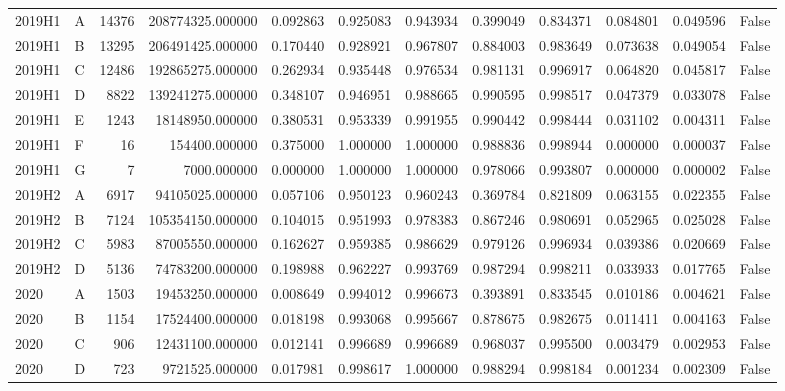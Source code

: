 \begin{tabular}{llrrrrrrrrrr}
2019H1 & A & 14376 & 208774325.000000 & 0.092863 & 0.925083 & 0.943934 & 0.399049 & 0.834371 & 0.084801 & 0.049596 & False \\
2019H1 & B & 13295 & 206491425.000000 & 0.170440 & 0.928921 & 0.967807 & 0.884003 & 0.983649 & 0.073638 & 0.049054 & False \\
2019H1 & C & 12486 & 192865275.000000 & 0.262934 & 0.935448 & 0.976534 & 0.981131 & 0.996917 & 0.064820 & 0.045817 & False \\
2019H1 & D & 8822 & 139241275.000000 & 0.348107 & 0.946951 & 0.988665 & 0.990595 & 0.998517 & 0.047379 & 0.033078 & False \\
2019H1 & E & 1243 & 18148950.000000 & 0.380531 & 0.953339 & 0.991955 & 0.990442 & 0.998444 & 0.031102 & 0.004311 & False \\
2019H1 & F & 16 & 154400.000000 & 0.375000 & 1.000000 & 1.000000 & 0.988836 & 0.998944 & 0.000000 & 0.000037 & False \\
2019H1 & G & 7 & 7000.000000 & 0.000000 & 1.000000 & 1.000000 & 0.978066 & 0.993807 & 0.000000 & 0.000002 & False \\
2019H2 & A & 6917 & 94105025.000000 & 0.057106 & 0.950123 & 0.960243 & 0.369784 & 0.821809 & 0.063155 & 0.022355 & False \\
2019H2 & B & 7124 & 105354150.000000 & 0.104015 & 0.951993 & 0.978383 & 0.867246 & 0.980691 & 0.052965 & 0.025028 & False \\
2019H2 & C & 5983 & 87005550.000000 & 0.162627 & 0.959385 & 0.986629 & 0.979126 & 0.996934 & 0.039386 & 0.020669 & False \\
2019H2 & D & 5136 & 74783200.000000 & 0.198988 & 0.962227 & 0.993769 & 0.987294 & 0.998211 & 0.033933 & 0.017765 & False \\
2020 & A & 1503 & 19453250.000000 & 0.008649 & 0.994012 & 0.996673 & 0.393891 & 0.833545 & 0.010186 & 0.004621 & False \\
2020 & B & 1154 & 17524400.000000 & 0.018198 & 0.993068 & 0.995667 & 0.878675 & 0.982675 & 0.011411 & 0.004163 & False \\
2020 & C & 906 & 12431100.000000 & 0.012141 & 0.996689 & 0.996689 & 0.968037 & 0.995500 & 0.003479 & 0.002953 & False \\
2020 & D & 723 & 9721525.000000 & 0.017981 & 0.998617 & 1.000000 & 0.988294 & 0.998184 & 0.001234 & 0.002309 & False \\
\bottomrule
\end{tabular}
